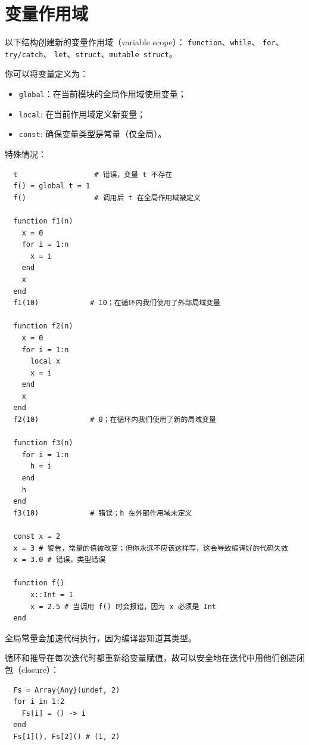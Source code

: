 \documentclass[10pt,a4paper]{article}
\begin{document}
\section{变量作用域}
以下结构创建新的变量作用域（variable scope）：
\lstinline|function|、\lstinline|while|、
\lstinline|for|、\lstinline|try/catch|、
\lstinline|let|、\lstinline|struct|、\lstinline|mutable struct|。

你可以将变量定义为：
\begin{itemize}
  \item \lstinline|global|：在当前模块的全局作用域使用变量；
  \item \lstinline|local|: 在当前作用域定义新变量；
  \item \lstinline|const|: 确保变量类型是常量（仅全局）。
\end{itemize}

特殊情况：
\begin{lstlisting}
  t                  # 错误，变量 t 不存在
  f() = global t = 1
  f()                # 调用后 t 在全局作用域被定义

  function f1(n)
    x = 0
    for i = 1:n
      x = i
    end
    x
  end
  f1(10)            # 10；在循环内我们使用了外部局域变量

  function f2(n)
    x = 0
    for i = 1:n
      local x
      x = i
    end
    x
  end
  f2(10)            # 0；在循环内我们使用了新的局域变量

  function f3(n)
    for i = 1:n
      h = i
    end
    h
  end
  f3(10)            # 错误；h 在外部作用域未定义

  const x = 2
  x = 3 # 警告，常量的值被改变；但你永远不应该这样写，这会导致编译好的代码失效
  x = 3.0 # 错误，类型错误

  function f()
      x::Int = 1
      x = 2.5 # 当调用 f() 时会报错，因为 x 必须是 Int
  end
\end{lstlisting}
全局常量会加速代码执行，因为编译器知道其类型。

循环和推导在每次迭代时都重新给变量赋值，故可以安全地在迭代中用他们创造闭包（closure）：
\begin{lstlisting}
  Fs = Array{Any}(undef, 2)
  for i in 1:2
    Fs[i] = () -> i
  end
  Fs[1](), Fs[2]() # (1, 2)
\end{lstlisting}
\end{document}
